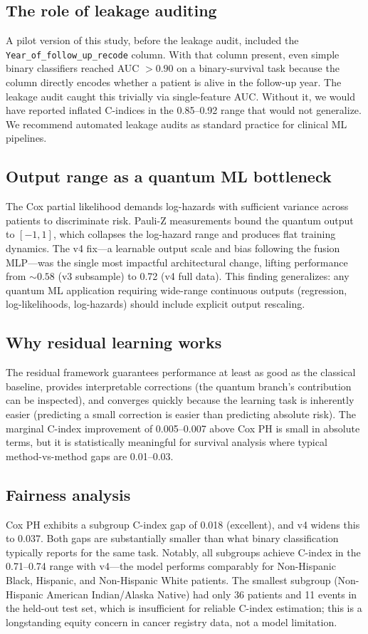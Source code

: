 \documentclass[12pt, letterpaper]{article}
\begin{document}
\subsection{The role of leakage auditing}
A pilot version of this study, before the leakage audit, included the \texttt{Year\_of\_follow\_up\_recode} column. With that column present, even simple binary classifiers reached AUC $> 0.90$ on a binary-survival task because the column directly encodes whether a patient is alive in the follow-up year. The leakage audit caught this trivially via single-feature AUC. Without it, we would have reported inflated C-indices in the 0.85--0.92 range that would not generalize. We recommend automated leakage audits as standard practice for clinical ML pipelines.

\subsection{Output range as a quantum ML bottleneck}
The Cox partial likelihood demands log-hazards with sufficient variance across patients to discriminate risk. Pauli-Z measurements bound the quantum output to $[-1, 1]$, which collapses the log-hazard range and produces flat training dynamics. The v4 fix---a learnable output scale and bias following the fusion MLP---was the single most impactful architectural change, lifting performance from $\sim 0.58$ (v3 subsample) to 0.72 (v4 full data). This finding generalizes: any quantum ML application requiring wide-range continuous outputs (regression, log-likelihoods, log-hazards) should include explicit output rescaling.

\subsection{Why residual learning works}
The residual framework guarantees performance at least as good as the classical baseline, provides interpretable corrections (the quantum branch's contribution can be inspected), and converges quickly because the learning task is inherently easier (predicting a small correction is easier than predicting absolute risk). The marginal C-index improvement of 0.005--0.007 above Cox PH is small in absolute terms, but it is statistically meaningful for survival analysis where typical method-vs-method gaps are 0.01--0.03.

\subsection{Fairness analysis}
Cox PH exhibits a subgroup C-index gap of 0.018 (excellent), and v4 widens this to 0.037. Both gaps are substantially smaller than what binary classification typically reports for the same task. Notably, all subgroups achieve C-index in the 0.71--0.74 range with v4---the model performs comparably for Non-Hispanic Black, Hispanic, and Non-Hispanic White patients. The smallest subgroup (Non-Hispanic American Indian/Alaska Native) had only 36 patients and 11 events in the held-out test set, which is insufficient for reliable C-index estimation; this is a longstanding equity concern in cancer registry data, not a model limitation.
\end{document}
